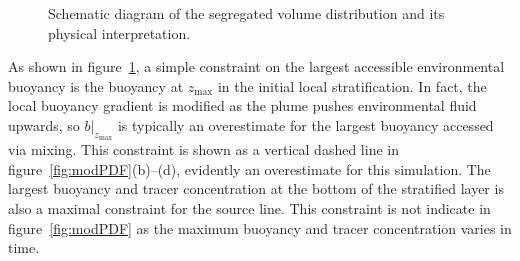 \documentclass[a4paper]{article}
\begin{document}
\begin{figure}
	\centering
	\caption{Schematic diagram of the segregated volume distribution and its physical interpretation.}
	\label{fig:PDFschematic}
\end{figure}

As shown in figure~\ref{fig:PDFschematic}, a simple constraint on the largest accessible environmental
buoyancy is the buoyancy at $z_{\max}$ in the initial local stratification.  In fact, the local buoyancy
gradient is modified as the plume pushes environmental fluid upwards, so $\left.b\right|_{z_{\max}}$ is
typically an overestimate for the largest buoyancy accessed via mixing. This constraint is shown as a
vertical dashed line in figure~\ref{fig:modPDF}(b)--(d), evidently an overestimate for this simulation.
The largest buoyancy and tracer concentration at the bottom of the stratified layer is also a maximal
constraint for the source line. This constraint is not indicate in figure~\ref {fig:modPDF} as the maximum
buoyancy and tracer concentration varies in time. 
\end{document}
